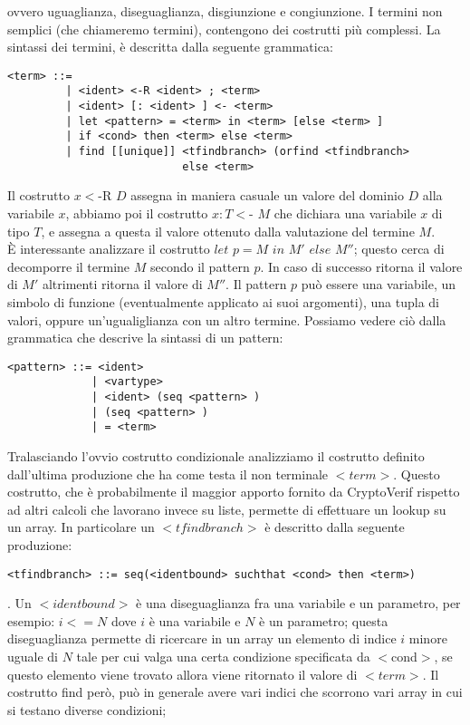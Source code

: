 \documentclass[a4paper,openright,twoside,12pt]{report}
\begin{document}
ovvero uguaglianza, diseguaglianza, disgiunzione e congiunzione. 
I termini non semplici (che chiameremo termini), contengono dei costrutti pi\`u complessi.
La sintassi dei termini, \`e descritta dalla seguente grammatica:
\begin{verbatim}
<term> ::= 
         | <ident> <-R <ident> ; <term>
         | <ident> [: <ident> ] <- <term>
         | let <pattern> = <term> in <term> [else <term> ]
         | if <cond> then <term> else <term>
         | find [[unique]] <tfindbranch> (orfind <tfindbranch> 
                           else <term>
\end{verbatim}
Il costrutto $x<$-R $D$ assegna in maniera casuale un valore del dominio $D$ alla variabile $x$, abbiamo poi il costrutto $x:T<$- $M$ che dichiara una variabile $x$ di tipo $T$,
e assegna a questa il valore ottenuto dalla valutazione del termine $M$. \\
\`E interessante analizzare il costrutto $let$ $p=M$ $in$ $M'$ $else$ $M''$; questo cerca di decomporre il termine $M$ secondo il pattern $p$. In caso di successo ritorna
il valore di $M'$ altrimenti ritorna il valore di $M''$. Il pattern $p$ pu\`o essere una variabile, un simbolo di funzione (eventualmente applicato ai suoi argomenti),
una tupla di valori, oppure un'ugualiglianza con un altro termine. Possiamo vedere ci\`o dalla grammatica che descrive la sintassi di un pattern:
\begin{verbatim}
<pattern> ::= <ident>
             | <vartype>
             | <ident> (seq <pattern> )
             | (seq <pattern> )
             | = <term>
\end{verbatim}
Tralasciando l'ovvio costrutto condizionale analizziamo il costrutto definito dall'ultima produzione che ha come testa il non terminale $<term>$.
Questo costrutto, che \`e probabilmente il maggior apporto fornito da CryptoVerif rispetto ad altri calcoli che lavorano invece su liste, permette di effettuare un lookup su un array.
In particolare un $<tfindbranch>$ \`e descritto dalla seguente produzione:
\begin{verbatim}<tfindbranch> ::= seq(<identbound> suchthat <cond> then <term>)\end{verbatim}. 
Un $<identbound>$ \`e una diseguaglianza fra una variabile e un parametro, per esempio: $i<=N$ dove $i$ \`e una variabile e $N$ \`e un parametro; questa diseguaglianza permette
di ricercare in un array un elemento di indice $i$ minore uguale di $N$ tale per cui valga una certa condizione specificata da $<$cond$>$,
se questo elemento viene trovato allora viene ritornato il valore di $<term>$. Il costrutto find per\`o, pu\`o in generale avere vari indici che scorrono vari array in cui si testano diverse condizioni; 
\end{document}
